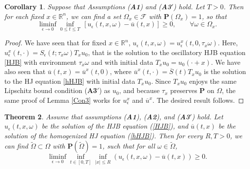 \documentclass[11pt,reqno]{amsart}
\newtheorem{thm}{Theorem}[section]
\newtheorem{cor}[thm]{Corollary}
\theoremstyle{definition}
\theoremstyle{remark}
\numberwithin{equation}{section}
\newcommand{\eps}{\epsilon}
\newcommand{\R}{{\mathbb{R}}}
\begin{document}
\begin{cor}\label{cor:pwlbdd}
Suppose that Assumptions {\upshape({\bf A1})} and {\upshape({\bf A3$'$})} hold. Let $T>0$. Then for each fixed $x\in \R^n$, we can find a set $\Omega_x\in \mathscr{F}$ with $\mathbf{P}(\Omega_x) = 1$, so that
\begin{equation}\label{lem:lbddx}
    \liminf_{\epsilon\rightarrow 0} %
    \inf_{0\leq t \leq T} \,[u_{\epsilon}(t,x,\omega) - \overline{u}(t,x)] \ge 0, \qquad \forall \omega \in \Omega_x.
\end{equation}
\end{cor}
\begin{proof} We have seen that for fixed $x\in \R^n$, $u_\eps(t,x,\omega) = u_\eps^x(t,0,\tau_x \omega)$. Here, $u_\eps^x(t,\cdot) = S_\eps(t;\tau_x\omega) T_x u_0$, that is the solution to the oscillatory HJB equation \eqref{HJB} with environment $\tau_x \omega$ and with initial data $T_x u_0 = u_0(\cdot + x)$. We have also seen that $\overline{u}(t,x) = \overline{u}^x(t,0)$, where $\overline{u}^x(t,\cdot) = \overline{S}(t)T_x u_0$ is the solution to the HJ equation \eqref{hHJB} with initial data $T_x u_0$. Since $T_xu_0$ enjoys the same Lipschitz bound condition ({\bf A3$'$}) as $u_0$, and because $\tau_x$ preserves $\mathbf{P}$ on $\Omega$, the same proof of Lemma \ref{Con3} works for $u_\eps^x$ and $\overline{u}^x$. The desired result follows. 
\end{proof}


\begin{thm}\label{LBR}
Assume that assumptions {\upshape ({\bf A1})}, {\upshape ({\bf A2})}, and {\upshape({\bf A3$'$})} hold. Let $u_{\epsilon}(t,x,\omega)$ be the solution of the {\upshape HJB}  equation (\ref{HJB}), and $\overline{u}(t,x)$ be the solution of the homogenized {\upshape HJ} equation (\ref{hHJB}). Then for every $R,T>0$, we can find $\widetilde{\Omega} \subset \Omega$ with $\mathbf{P}(\widetilde\Omega) = 1$, such that for all $\omega \in \widetilde\Omega$, 
\begin{equation}\label{eq:uflbdd}
    \liminf_{\epsilon\rightarrow 0}\inf_{t\in[0,T]}\inf_{|x|\leq R}(u_{\epsilon}(t,x,\omega) - \overline{u}(t,x)) \geq 0 .
\end{equation}
\end{thm}
\end{document}
